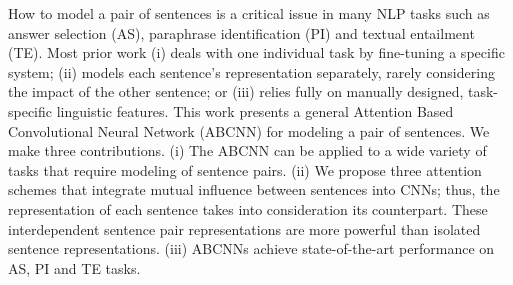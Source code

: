 How to model a pair of sentences is a critical issue in many NLP tasks such as answer selection (AS), paraphrase identification (PI) and textual entailment (TE). Most prior work (i) deals with one individual task by fine-tuning a specific system; (ii) models each sentence's representation separately, rarely considering the impact of the other sentence; or (iii) relies fully on manually designed, task-specific linguistic features. This work presents a general Attention Based Convolutional Neural Network (ABCNN) for modeling a pair of sentences. We make three contributions. (i) The ABCNN can be applied to a wide variety of tasks that require modeling of sentence pairs. (ii) We propose three attention schemes that integrate mutual influence between sentences into CNNs; thus, the representation of each sentence takes into consideration its counterpart. These interdependent sentence pair representations are more powerful than isolated sentence representations.  (iii) ABCNNs achieve state-of-the-art performance on AS, PI and TE tasks.

